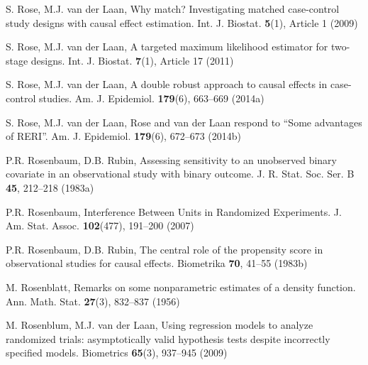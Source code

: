 \begin{list}{}{\setlength{\leftmargin}{2.1em}\setlength{\labelwidth}{0pt}
  \setlength{\labelsep}{0pt}\setlength{\itemindent}{-2.1em}
  \setlength{\parsep}{0pt}\setlength{\itemsep}{2pt}\setlength{\topsep}{0pt}}
\item\label{refentry:REF318}S. Rose, M.J. van der Laan, Why match? Investigating matched case-control study designs with causal effect estimation. Int. J. Biostat. \textbf{5}(1), Article 1 (2009)\label{refend:REF318}
\item\label{refentry:REF319}S. Rose, M.J. van der Laan, A targeted maximum likelihood estimator for two-stage designs. Int. J. Biostat. \textbf{7}(1), Article 17 (2011)\label{refend:REF319}
\item\label{refentry:REF320}S. Rose, M.J. van der Laan, A double robust approach to causal effects in case-control studies. Am. J. Epidemiol. \textbf{179}(6), 663--669 (2014a)\label{refend:REF320}
\item\label{refentry:REF321}S. Rose, M.J. van der Laan, Rose and van der Laan respond to ``Some advantages of RERI''. Am. J. Epidemiol. \textbf{179}(6), 672--673 (2014b)\label{refend:REF321}
\item\label{refentry:REF322}P.R. Rosenbaum, D.B. Rubin, Assessing sensitivity to an unobserved binary covariate in an observational study with binary outcome. J. R. Stat. Soc. Ser. B \textbf{45}, 212--218 (1983a)\label{refend:REF322}
\item\label{refentry:REF323}P.R. Rosenbaum, Interference Between Units in Randomized Experiments. J. Am. Stat. Assoc. \textbf{102}(477), 191--200 (2007)\label{refend:REF323}
\item\label{refentry:REF324}P.R. Rosenbaum, D.B. Rubin, The central role of the propensity score in observational studies for causal effects. Biometrika \textbf{70}, 41--55 (1983b)\label{refend:REF324}
\item\label{refentry:REF325}M. Rosenblatt, Remarks on some nonparametric estimates of a density function. Ann. Math. Stat. \textbf{27}(3), 832--837 (1956)\label{refend:REF325}
\item\label{refentry:REF326}M. Rosenblum, M.J. van der Laan, Using regression models to analyze randomized trials: asymptotically valid hypothesis tests despite incorrectly specified models. Biometrics \textbf{65}(3), 937--945 (2009)\label{refend:REF326}

\end{list}
